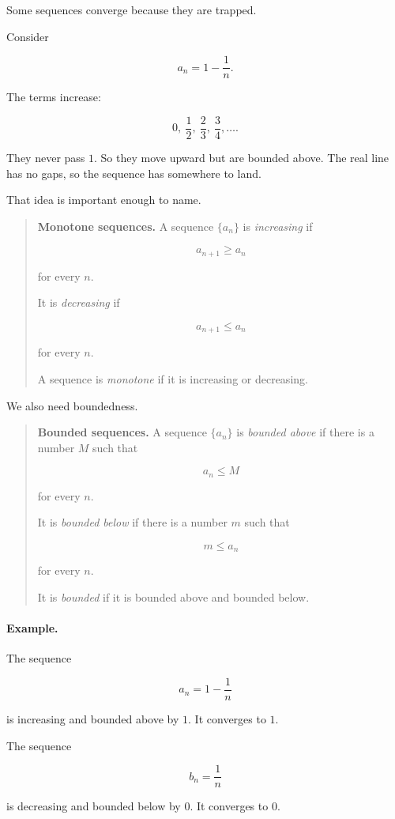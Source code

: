 Some sequences converge because they are trapped.

Consider

\[
a_n=1-\frac1n.
\]

The terms increase:

\[
0,\ \frac12,\ \frac23,\ \frac34,\ldots.
\]

They never pass \(1\).  So they move upward but are bounded above.  The real line has
no gaps, so the sequence has somewhere to land.

That idea is important enough to name.

\begin{quote}
\textbf{Monotone sequences.}
A sequence \(\{a_n\}\) is \emph{increasing} if

\[
a_{n+1}\ge a_n
\]

for every \(n\).

It is \emph{decreasing} if

\[
a_{n+1}\le a_n
\]

for every \(n\).

A sequence is \emph{monotone} if it is increasing or decreasing.
\end{quote}

We also need boundedness.

\begin{quote}
\textbf{Bounded sequences.}
A sequence \(\{a_n\}\) is \emph{bounded above} if there is a number \(M\) such that

\[
a_n\le M
\]

for every \(n\).

It is \emph{bounded below} if there is a number \(m\) such that

\[
m\le a_n
\]

for every \(n\).

It is \emph{bounded} if it is bounded above and bounded below.
\end{quote}

\paragraph{Example.}
The sequence

\[
a_n=1-\frac1n
\]

is increasing and bounded above by \(1\).  It converges to \(1\).

The sequence

\[
b_n=\frac1n
\]

is decreasing and bounded below by \(0\).  It converges to \(0\).

